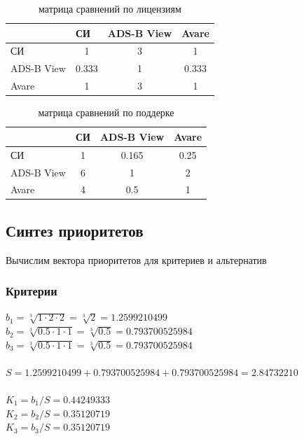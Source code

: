 \documentclass[a4paper,12pt]{report} %
\begin{document}
\begin{table}
  \caption{матрица сравнений по лицензиям}
  \begin{tabular}{l|c|c|c|}
    \cline{2-4}
    {}                               & \multicolumn{1}{l|}{СИ}        & \multicolumn{1}{l|}{ADS-B View} & \multicolumn{1}{l|}{Avare} \\ \hline
    \multicolumn{1}{|l|}{СИ}         & 1                              & 3                               & 1                          \\ \hline
    \multicolumn{1}{|l|}{ADS-B View} & 0.333                          & 1                               & 0.333                      \\ \hline
    \multicolumn{1}{|l|}{Avare}      & 1                              & 3                               & 1                          \\ \hline
  \end{tabular}
\end{table}

\begin{table}
  \caption{матрица сравнений по поддерке}
  \begin{tabular}{l|c|c|c|}
    \cline{2-4}
    {}                               & \multicolumn{1}{l|}{СИ}        & \multicolumn{1}{l|}{ADS-B View} & \multicolumn{1}{l|}{Avare} \\ \hline
    \multicolumn{1}{|l|}{СИ}         & 1                              & 0.165                           & 0.25                       \\ \hline
    \multicolumn{1}{|l|}{ADS-B View} & 6                              & 1                               & 2                          \\ \hline
    \multicolumn{1}{|l|}{Avare}      & 4                              & 0.5                             & 1                          \\ \hline
  \end{tabular}
\end{table}
\subsection{Синтез приоритетов}
Вычислим вектора приоритетов для критериев и альтернатив

\subsubsection{Критерии}
$ b_1=\sqrt[3]{1 \cdot 2 \cdot 2} = \sqrt[3]{2} = 1.2599210499 $ \\
$ b_2=\sqrt[3]{0.5 \cdot 1 \cdot 1} = \sqrt[3]{0.5} = 0.793700525984 $ \\
$ b_3=\sqrt[3]{0.5 \cdot 1 \cdot 1} = \sqrt[3]{0.5} = 0.793700525984 $ \\
\\
$ S = 1.2599210499 + 0.793700525984 + 0.793700525984 = 2.84732210 $ \\
\\
$K_1 = b_1/S = 0.44249333 $ \\
$K_2 = b_2/S = 0.35120719 $ \\
$K_3 = b_3/S = 0.35120719 $ \\
\end{document}
